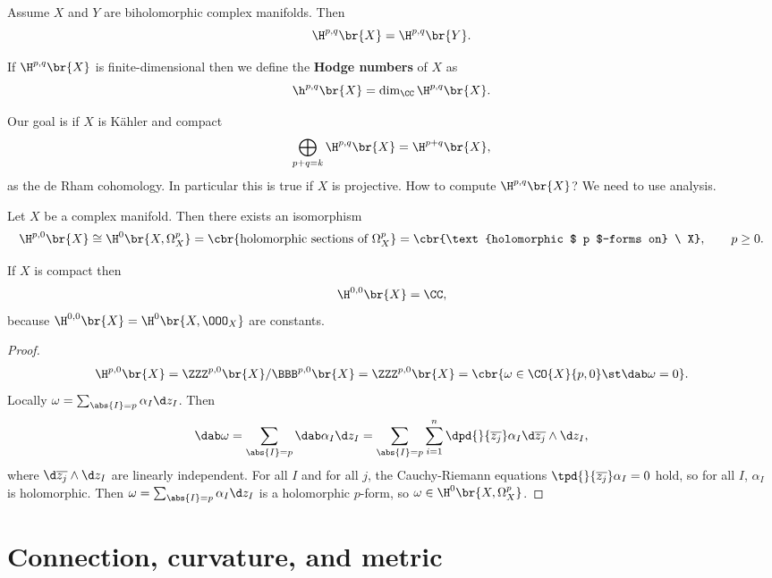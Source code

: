 \pagebreak

\begin{exercise*}
Assume $ X $ and $ Y $ are biholomorphic complex manifolds. Then
$$ \H^{p, q}\br{X} = \H^{p, q}\br{Y}. $$
\end{exercise*}

If $ \H^{p, q}\br{X} $ is finite-dimensional then we define the \textbf{Hodge numbers} of $ X $ as
$$ \h^{p, q}\br{X} = \dim_\CC \H^{p, q}\br{X}. $$


Our goal is if $ X $ is K\"ahler and compact
$$ \bigoplus_{p + q = k} \H^{p, q}\br{X} = \H^{p + q}\br{X}, $$
as the de Rham cohomology. In particular this is true if $ X $ is projective. How to compute $ \H^{p, q}\br{X} $? We need to use analysis.

\begin{proposition}
Let $ X $ be a complex manifold. Then there exists an isomorphism
$$ \H^{p, 0}\br{X} \cong \H^0\br{X, \Omega_X^p} = \cbr{\text{holomorphic sections of} \ \Omega_X^p} = \cbr{\text{holomorphic $ p $-forms on} \ X}, \qquad p \ge 0. $$
\end{proposition}

\begin{remark*}
If $ X $ is compact then
$$ \H^{0, 0}\br{X} = \CC, $$
because $ \H^{0, 0}\br{X} = \H^0\br{X, \OOO_X} $ are constants.
\end{remark*}

\begin{proof}
$$ \H^{p, 0}\br{X} = \ZZZ^{p, 0}\br{X} / \BBB^{p, 0}\br{X} = \ZZZ^{p, 0}\br{X} = \cbr{\omega \in \CO{X}{p, 0} \st \dab\omega = 0}. $$
Locally $ \omega = \sum_{\abs{I} = p} \alpha_I\d z_I $. Then
$$ \dab\omega = \sum_{\abs{I} = p} \dab\alpha_I\d z_I = \sum_{\abs{I} = p} \sum_{i = 1}^n \dpd{}{\overline{z_j}}\alpha_I\d\overline{z_j} \wedge \d z_I, $$
where $ \d\overline{z_j} \wedge \d z_I $ are linearly independent. For all $ I $ and for all $ j $, the Cauchy-Riemann equations $ \tpd{}{\overline{z_j}}\alpha_I = 0 $ hold, so for all $ I $, $ \alpha_I $ is holomorphic. Then $ \omega = \sum_{\abs{I} = p} \alpha_I\d z_I $ is a holomorphic $ p $-form, so $ \omega \in \H^0\br{X, \Omega_X^p} $.
\end{proof}

\pagebreak

\section{Connection, curvature, and metric}


